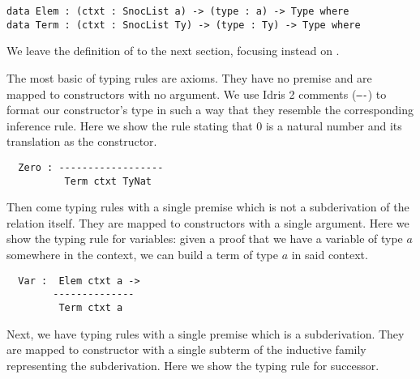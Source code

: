 \begin{minipage}{0.10\textwidth}
\varRule
\inferenceRule
\end{minipage}\hfill
\begin{minipage}{0.80\textwidth}
\begin{Verbatim}
data Elem : (ctxt : SnocList a) -> (type : a) -> Type where
data Term : (ctxt : SnocList Ty) -> (type : Ty) -> Type where
\end{Verbatim}
\end{minipage}

We leave the definition of  to the next section,
focusing instead on .

The most basic of typing rules are axioms. They have no premise
and are mapped to constructors with no argument. We use Idris 2
comments (\texttt{----}) to format our constructor's type in such
a way that they resemble the corresponding inference rule.
%
Here we show the rule stating that $0$ is a natural number and
its translation as the  constructor.

\begin{minipage}{0.45\textwidth}
\inferenceZero
\end{minipage}\hfill
\begin{minipage}{0.45\textwidth}
\begin{Verbatim}
  Zero : ------------------
          Term ctxt TyNat
\end{Verbatim}
\end{minipage}

Then come typing rules with a single premise which is not a subderivation
of the relation itself.
They are mapped to constructors with a single argument.
%
Here we show the typing rule for variables: given a proof that we have a
variable of type $a$ somewhere in the context, we can build a term of type
$a$ in said context.

\begin{minipage}{0.45\textwidth}
\inferenceVar
\end{minipage}\hfill
\begin{minipage}{0.45\textwidth}
\begin{Verbatim}
  Var :  Elem ctxt a ->
        --------------
         Term ctxt a
\end{Verbatim}
\end{minipage}

Next, we have typing rules with a single premise which is a subderivation.
They are mapped to constructor with a single subterm of the inductive family
representing the subderivation.
%
Here we show the typing rule for successor.

